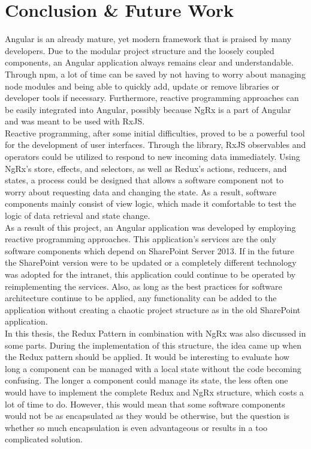 \documentclass[Bachelor,BIF,english]{twbook}
\begin{document}
\chapter{Conclusion \& Future Work}
Angular is an already mature, yet modern framework that is praised by many developers. Due to the modular project structure and the loosely coupled components, an Angular application always remains clear and understandable. Through npm, a lot of time can be saved by not having to worry about managing node modules and being able to quickly add, update or remove libraries or developer tools if necessary.  Furthermore, reactive programming approaches can be easily integrated into Angular, possibly because NgRx is a part of Angular and was meant to be used with RxJS. 
\\[\baselineskip]
Reactive programming, after some initial difficulties, proved to be a powerful tool for the development of user interfaces. Through the library, RxJS observables and operators could be utilized to respond to new incoming data immediately. Using NgRx's store, effects, and selectors, as well as Redux's actions, reducers, and states, a process could be designed that allows a software component not to worry about requesting data and changing the state. As a result, software components mainly consist of view logic, which made it comfortable to test the logic of data retrieval and state change.
\\[\baselineskip]
As a result of this project, an Angular application was developed by employing reactive programming approaches. This application's services are the only software components which depend on SharePoint Server 2013. If in the future the SharePoint version were to be updated or a completely different technology was adopted for the intranet, this application could continue to be operated by reimplementing the services. Also, as long as the best practices for software architecture continue to be applied, any functionality can be added to the application without creating a chaotic project structure as in the old SharePoint application.
\\[\baselineskip]
In this thesis, the Redux Pattern in combination with NgRx was also discussed in some parts. During the implementation of this structure, the idea came up when the Redux pattern should be applied. It would be interesting to evaluate how long a component can be managed with a local state without the code becoming confusing. The longer a component could manage its state, the less often one would have to implement the complete Redux and NgRx structure, which costs a lot of time to do. However, this would mean that some software components would not be as encapsulated as they would be otherwise, but the question is whether so much encapsulation is even advantageous or results in a too complicated solution.
\end{document}
